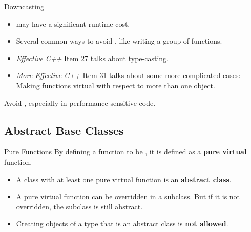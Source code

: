 \documentclass{beamer}
\begin{document}
\begin{frame}{Downcasting}
    \begin{itemize}
        \item {} may have a significant runtime cost.
        \item Several common ways to avoid , like writing a group of \virtual functions.
        \item \textit{Effective C++} Item 27 talks about type-casting.
        \item \textit{More Effective C++} Item 31 talks about some more complicated cases: Making functions virtual with respect to more than one object.
    \end{itemize}
    \begin{notice}
        Avoid , especially in performance-sensitive code.
    \end{notice}
\end{frame}

\subsection{Abstract Base Classes}

\begin{frame}[fragile]{Pure \virtual Functions}
    By defining a function to be , it is defined as a \textbf{pure virtual} function.
    \begin{itemize}
        \item A class with at least one pure virtual function is an \textbf{abstract class}.
        \item A pure virtual function can be overridden in a subclass. But if it is not overridden, the subclass is still abstract.
        \item Creating objects of a type that is an abstract class is \textbf{not allowed}.
    \end{itemize}
\end{frame}
\end{document}
